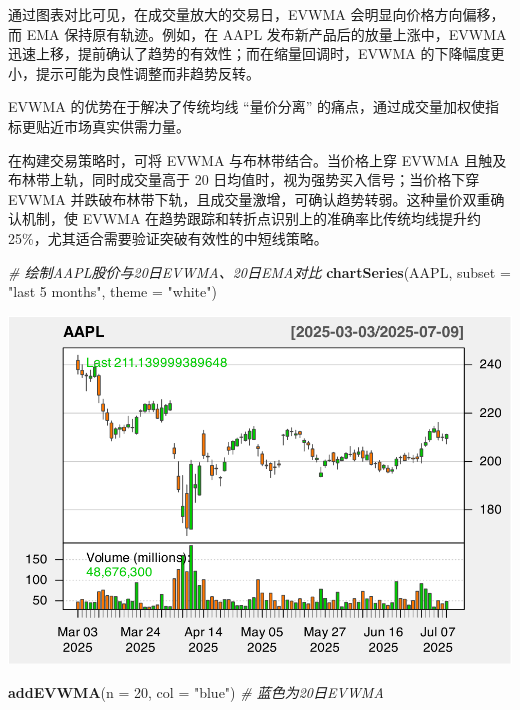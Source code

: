 \documentclass[]{ctexbook}
\newenvironment{Shaded}{\begin{snugshade}}{\end{snugshade}}
\newcommand{\AttributeTok}[1]{\textcolor[rgb]{0.13,0.29,0.53}{#1}}
\newcommand{\CommentTok}[1]{\textcolor[rgb]{0.56,0.35,0.01}{\textit{#1}}}
\newcommand{\DecValTok}[1]{\textcolor[rgb]{0.00,0.00,0.81}{#1}}
\newcommand{\FunctionTok}[1]{\textcolor[rgb]{0.13,0.29,0.53}{\textbf{#1}}}
\newcommand{\NormalTok}[1]{#1}
\newcommand{\StringTok}[1]{\textcolor[rgb]{0.31,0.60,0.02}{#1}}
\begin{document}
通过图表对比可见，在成交量放大的交易日，EVWMA 会明显向价格方向偏移，而 EMA 保持原有轨迹。例如，在 AAPL 发布新产品后的放量上涨中，EVWMA 迅速上移，提前确认了趋势的有效性；而在缩量回调时，EVWMA 的下降幅度更小，提示可能为良性调整而非趋势反转。

EVWMA 的优势在于解决了传统均线 ``量价分离'' 的痛点，通过成交量加权使指标更贴近市场真实供需力量。

在构建交易策略时，可将 EVWMA 与布林带结合。当价格上穿 EVWMA 且触及布林带上轨，同时成交量高于 20 日均值时，视为强势买入信号；当价格下穿 EVWMA 并跌破布林带下轨，且成交量激增，可确认趋势转弱。这种量价双重确认机制，使 EVWMA 在趋势跟踪和转折点识别上的准确率比传统均线提升约 25\%，尤其适合需要验证突破有效性的中短线策略。

\begin{Shaded}
\begin{Highlighting}[]
\CommentTok{\# 绘制AAPL股价与20日EVWMA、20日EMA对比}
\FunctionTok{chartSeries}\NormalTok{(AAPL, }\AttributeTok{subset =} \StringTok{"last 5 months"}\NormalTok{, }\AttributeTok{theme =} \StringTok{"white"}\NormalTok{)}
\end{Highlighting}
\end{Shaded}

\includegraphics[width=0.9\linewidth]{quantmod_files/figure-latex/evwma_2-1}

\begin{Shaded}
\begin{Highlighting}[]
\FunctionTok{addEVWMA}\NormalTok{(}\AttributeTok{n =} \DecValTok{20}\NormalTok{, }\AttributeTok{col =} \StringTok{"blue"}\NormalTok{)   }\CommentTok{\# 蓝色为20日EVWMA}
\end{Highlighting}
\end{Shaded}
\end{document}
